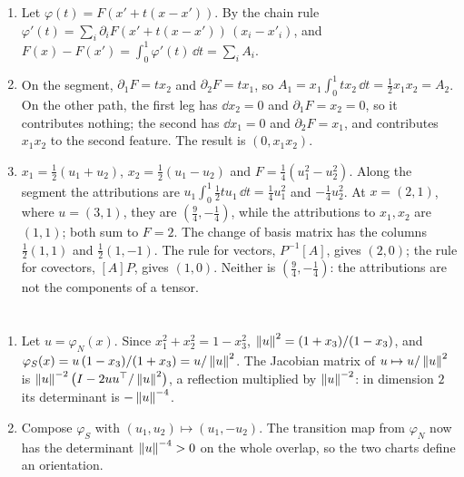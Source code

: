 \begin{enumerate}[nosep]
  \item Let $\varphi(t) = F(x' + t(x - x'))$. By the chain rule
        $\varphi'(t) = \sum_i\partial_iF(x' + t(x - x'))\,(x_i - x'_i)$,
        and $F(x) - F(x') = \int_0^1\varphi'(t)\,\dd t = \sum_iA_i$.
  \item On the segment, $\partial_1F = tx_2$ and $\partial_2F = tx_1$,
        so $A_1 = x_1\int_0^1tx_2\,\dd t = \frac12x_1x_2 = A_2$. On the
        other path, the first leg has $\dd x_2 = 0$ and
        $\partial_1F = x_2 = 0$, so it contributes nothing; the second
        has $\dd x_1 = 0$ and $\partial_2F = x_1$, and contributes
        $x_1x_2$ to the second feature. The result is $(0, x_1x_2)$.
  \item $x_1 = \frac12(u_1 + u_2)$, $x_2 = \frac12(u_1 - u_2)$ and
        $F = \frac14(u_1^2 - u_2^2)$. Along the segment the
        attributions are
        $u_1\int_0^1\frac12tu_1\,\dd t = \frac14u_1^2$ and
        $-\frac14u_2^2$. At $x = (2, 1)$, where $u = (3, 1)$, they are
        $(\frac94, -\frac14)$, while the attributions to $x_1, x_2$ are
        $(1, 1)$; both sum to $F = 2$. The change of basis matrix has
        the columns $\frac12(1, 1)$ and $\frac12(1, -1)$. The rule for
        vectors, $P^{-1}[A]$, gives $(2, 0)$; the rule for covectors,
        $[A]P$, gives $(1, 0)$. Neither is $(\frac94, -\frac14)$: the
        attributions are not the components of a tensor.
\end{enumerate}

\section{}

\begin{enumerate}[nosep]
  \item Let $u = \varphi_N(x)$. Since $x_1^2 + x_2^2 = 1 - x_3^2$,
        $\left\|u\right\|^2 = (1 + x_3)/(1 - x_3)$, and
        $\varphi_S(x) = u\,(1 - x_3)/(1 + x_3) = u/\left\|u\right\|^2$. The
        Jacobian matrix of $u\mapsto u/\left\|u\right\|^2$ is
        $\left\|u\right\|^{-2}\bigl(I - 2uu^\top/\left\|u\right\|^2\bigr)$, a reflection
        multiplied by $\left\|u\right\|^{-2}$: in dimension $2$ its determinant
        is $-\left\|u\right\|^{-4}$.
  \item Compose $\varphi_S$ with $(u_1, u_2)\mapsto(u_1, -u_2)$. The
        transition map from $\varphi_N$ now has the determinant
        $\left\|u\right\|^{-4} > 0$ on the whole overlap, so the two charts
        define an orientation.
\end{enumerate}

